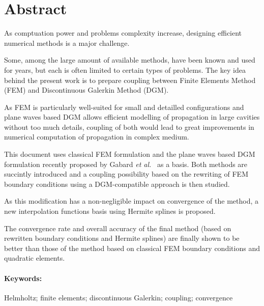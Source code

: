 \section*{Abstract}

As comptuation power and problems complexity increase, designing efficient numerical methods is a major challenge.

Some, among the large amount of available methods, have been known and used for years, but each is often limited to
certain types of problems. The key idea behind the present work is to prepare coupling between Finite Elements
Method (FEM) and Discontinuous Galerkin Method (DGM).

As FEM is particularly well-suited for small and detailled configurations and plane waves based DGM allows efficient modelling of
propagation in large cavities without too much details, coupling of both would lead to great improvements in
numerical computation of propagation in complex medium.

This document uses classical FEM formulation and the plane waves based DGM formulation recently proposed by
Gabard \textit{et al.}~\cite{Gabard15,Gabard11} as a basis. Both methods are succintly introduced and a coupling possibility
based on the rewriting of FEM boundary conditions using a DGM-compatible approach is then studied.

As this modification has a non-negligible impact on convergence of the method, a new interpolation functions basis
using Hermite splines is proposed.

The convergence rate and overall accuracy of the final method (based on rewritten boundary conditions and Hermite
splines) are finally shown to be better than those of the method based on classical FEM boundary conditions and
quadratic elements.

\paragraph{Keywords:} Helmholtz; finite elements; discontinuous Galerkin; coupling; convergence
